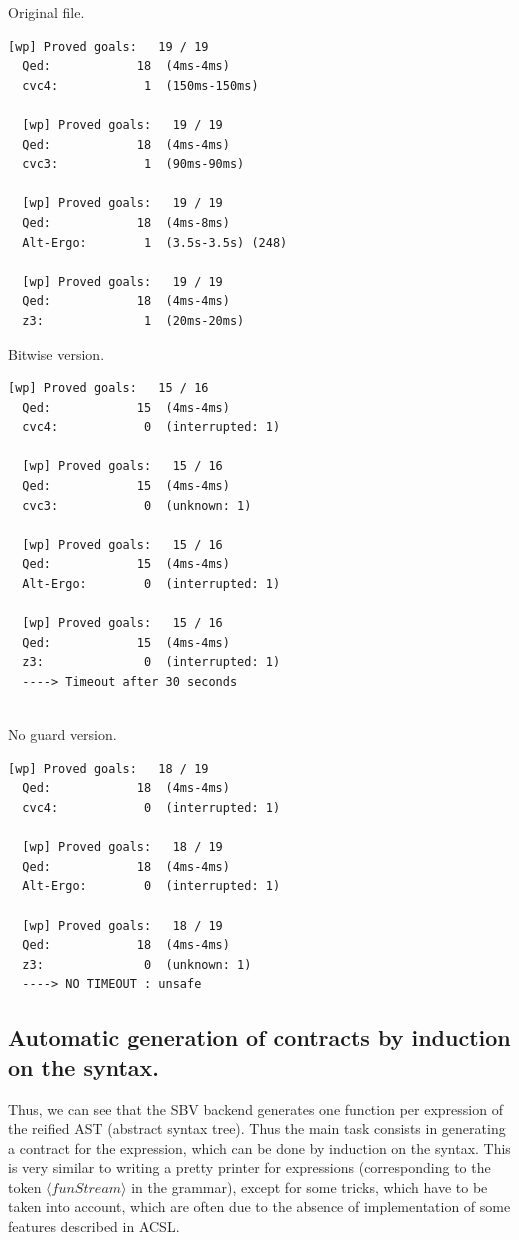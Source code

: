 \documentclass[a4paper,11pt,final]{article}
\begin{document}
  \begin{multicols}{3}
  Original file.
  \begin{lstlisting}[basicstyle=\tiny]
  [wp] Proved goals:   19 / 19
  Qed:            18  (4ms-4ms)
  cvc4:            1  (150ms-150ms)
  
  [wp] Proved goals:   19 / 19
  Qed:            18  (4ms-4ms)
  cvc3:            1  (90ms-90ms)
  
  [wp] Proved goals:   19 / 19
  Qed:            18  (4ms-8ms)
  Alt-Ergo:        1  (3.5s-3.5s) (248)
  
  [wp] Proved goals:   19 / 19
  Qed:            18  (4ms-4ms)
  z3:              1  (20ms-20ms)
  \end{lstlisting}
  \columnbreak
  Bitwise version.
  \begin{lstlisting}[basicstyle=\tiny]
  [wp] Proved goals:   15 / 16
  Qed:            15  (4ms-4ms)
  cvc4:            0  (interrupted: 1)
  
  [wp] Proved goals:   15 / 16
  Qed:            15  (4ms-4ms)
  cvc3:            0  (unknown: 1)
  
  [wp] Proved goals:   15 / 16
  Qed:            15  (4ms-4ms)
  Alt-Ergo:        0  (interrupted: 1)
  
  [wp] Proved goals:   15 / 16
  Qed:            15  (4ms-4ms)
  z3:              0  (interrupted: 1)    
  ----> Timeout after 30 seconds
  
  \end{lstlisting}
  \columnbreak
  No guard version.
  \begin{lstlisting}[basicstyle=\tiny]
  [wp] Proved goals:   18 / 19
  Qed:            18  (4ms-4ms)
  cvc4:            0  (interrupted: 1)
  
  [wp] Proved goals:   18 / 19
  Qed:            18  (4ms-4ms)
  Alt-Ergo:        0  (interrupted: 1)
  
  [wp] Proved goals:   18 / 19
  Qed:            18  (4ms-4ms)
  z3:              0  (unknown: 1)   
  ----> NO TIMEOUT : unsafe
  \end{lstlisting}
  \end{multicols}
  
  
  \subsection{Automatic generation of contracts by induction on the syntax.}
  
  Thus, we can see that the SBV backend generates one function per expression of the reified AST (abstract syntax tree). Thus the main task consists in generating a contract for the expression, which can be done by induction on the syntax. This is very similar to writing a pretty printer for expressions (corresponding to the token $\langle funStream \rangle$ in the grammar), except for some tricks, which have to be taken into account, which are often due to the absence of implementation of some features described in ACSL.
  
\end{document}
